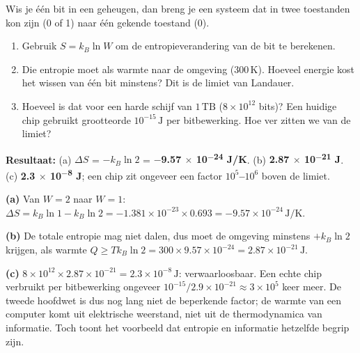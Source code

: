 \begin{oefening}
Wis je één bit in een geheugen, dan breng je een systeem dat in twee toestanden kon zijn (0 of 1) naar één gekende toestand (0).

\begin{enumerate}
\item[(a)]
  Gebruik \(S = k_B\ln W\) om de entropieverandering van de bit te berekenen.
\item[(b)]
  Die entropie moet als warmte naar de omgeving (\(300\,\mathrm{K}\)). Hoeveel energie kost het wissen van één bit minstens? Dit is de limiet van Landauer.
\item[(c)]
  Hoeveel is dat voor een harde schijf van \(1\,\mathrm{TB}\) (\(8 \times 10^{12}\) bits)? Een huidige chip gebruikt grootteorde \(10^{-15}\,\mathrm{J}\) per bitbewerking. Hoe ver zitten we van de limiet?
\end{enumerate}
\end{oefening}
\begin{oplossing}
\textbf{Resultaat:} (a) \(\Delta S\) = \(-k_B\ln 2\) = \textbf{\ensuremath{-}9.57 \ensuremath{\times} 10\textsuperscript{\ensuremath{-}24} J/K}. (b) \textbf{2.87 \ensuremath{\times} 10\textsuperscript{\ensuremath{-}21} J}. (c) \textbf{2.3 \ensuremath{\times} 10\textsuperscript{\ensuremath{-}8} J}; een chip zit ongeveer een factor \textbf{\(10^5\)--\(10^6\)} boven de limiet.

\textbf{(a)} Van \(W = 2\) naar \(W = 1\): \(\Delta S = k_B\ln 1 - k_B\ln 2 = -1.381 \times 10^{-23} \times 0.693 = -9.57 \times 10^{-24}\,\mathrm{J/K}\).

\textbf{(b)} De totale entropie mag niet dalen, dus moet de omgeving minstens \(+k_B\ln 2\) krijgen, als warmte \(Q \geq T k_B\ln 2 = 300 \times 9.57 \times 10^{-24} = 2.87 \times 10^{-21}\,\mathrm{J}\).

\textbf{(c)} \(8 \times 10^{12} \times 2.87 \times 10^{-21} = 2.3 \times 10^{-8}\,\mathrm{J}\): verwaarloosbaar. Een echte chip verbruikt per bitbewerking ongeveer \(10^{-15}/2.9 \times 10^{-21} \approx 3 \times 10^5\) keer meer. De tweede hoofdwet is dus nog lang niet de beperkende factor; de warmte van een computer komt uit elektrische weerstand, niet uit de thermodynamica van informatie. Toch toont het voorbeeld dat entropie en informatie hetzelfde begrip zijn.
\end{oplossing}

